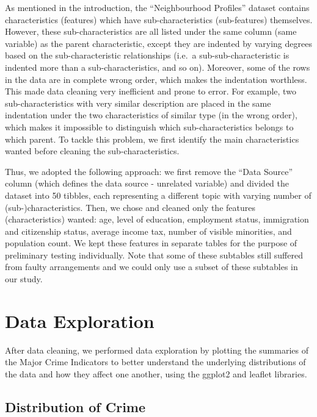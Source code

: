 \documentclass[
]{article}
\begin{document}
As mentioned in the introduction, the ``Neighbourhood Profiles'' dataset
contains characteristics (features) which have sub-characteristics
(sub-features) themselves. However, these sub-characteristics are all
listed under the same column (same variable) as the parent
characteristic, except they are indented by varying degrees based on the
sub-characteristic relationships (i.e.~a sub-sub-characteristic is
indented more than a sub-characteristics, and so on). Moreover, some of
the rows in the data are in complete wrong order, which makes the
indentation worthless. This made data cleaning very inefficient and
prone to error. For example, two sub-characteristics with very similar
description are placed in the same indentation under the two
characteristics of similar type (in the wrong order), which makes it
impossible to distinguish which sub-characteristics belongs to which
parent. To tackle this problem, we first identify the main
characteristics wanted before cleaning the sub-characteristics.

Thus, we adopted the following approach: we first remove the ``Data
Source'' column (which defines the data source - unrelated variable) and
divided the dataset into 50 tibbles, each representing a different topic
with varying number of (sub-)characteristics. Then, we chose and cleaned
only the features (characteristics) wanted: age, level of education,
employment status, immigration and citizenship status, average income
tax, number of visible minorities, and population count. We kept these
features in separate tables for the purpose of preliminary testing
individually. Note that some of these subtables still suffered from
faulty arrangements and we could only use a subset of these subtables in
our study.

\hypertarget{data-exploration}{%
\section{Data Exploration}\label{data-exploration}}

After data cleaning, we performed data exploration by plotting the
summaries of the Major Crime Indicators to better understand the
underlying distributions of the data and how they affect one another,
using the ggplot2 and leaflet libraries.

\hypertarget{distribution-of-crime}{%
\subsection{Distribution of Crime}\label{distribution-of-crime}}
\end{document}
